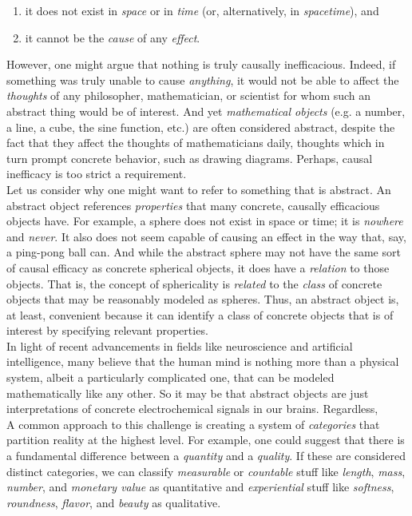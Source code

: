 \begin{enumerate}
    \item it does not exist in \textit{space} or in \textit{time} (or, alternatively, in \textit{spacetime}), and
    \item it cannot be the \textit{cause} of any \textit{effect}.
\end{enumerate}

However, one might argue that nothing is truly causally inefficacious. Indeed, if something was truly unable to cause \textit{anything}, it would not be able to affect the \textit{thoughts} of any philosopher, mathematician, or scientist for whom such an abstract thing would be of interest. And yet \textit{mathematical objects} (e.g. a number, a line, a cube, the sine function, etc.) are often considered abstract, despite the fact that they affect the thoughts of mathematicians daily, thoughts which in turn prompt concrete behavior, such as drawing diagrams. Perhaps, causal inefficacy is too strict a requirement. \\

Let us consider why one might want to refer to something that is abstract. An abstract object references \textit{properties} that many concrete, causally efficacious objects have. For example, a sphere does not exist in space or time; it is \textit{nowhere} and \textit{never}. It also does not seem capable of causing an effect in the way that, say, a ping-pong ball can. And while the abstract sphere may not have the same sort of causal efficacy as concrete spherical objects, it does have a \textit{relation} to those objects. That is, the concept of sphericality is \textit{related} to the \textit{class} of concrete objects that may be reasonably modeled as spheres. Thus, an abstract object is, at least, convenient because it can identify a class of concrete objects that is of interest by specifying relevant properties. \\

In light of recent advancements in fields like neuroscience and artificial intelligence, many believe that the human mind is nothing more than a physical system, albeit a particularly complicated one, that can be modeled mathematically like any other. So it may be that abstract objects are just interpretations of concrete electrochemical signals in our brains. Regardless,  \\

A common approach to this challenge is creating a system of \textit{categories} that partition reality at the highest level. For example, one could suggest that there is a fundamental difference between a \textit{quantity} and a \textit{quality}. If these are considered distinct categories, we can classify \textit{measurable} or \textit{countable} stuff like \textit{length}, \textit{mass}, \textit{number}, and \textit{monetary value} as quantitative and \textit{experiential} stuff like \textit{softness}, \textit{roundness}, \textit{flavor}, and \textit{beauty} as qualitative. \\

